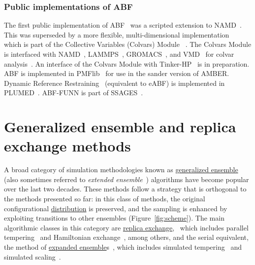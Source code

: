\documentclass[9pt,review]{livecoms}
\begin{document}
\subsubsection{Public implementations of ABF}

The first public implementation of ABF~\cite{Henin2004} was a scripted extension to NAMD~\cite{Phillips2020}.
This was superseded by a more flexible, multi-dimensional implementation~\cite{Henin2010a} which is part of the Collective Variables (Colvars) Module ~\cite{Fiorin2013}.
The Colvars Module is interfaced with NAMD~\cite{Phillips2020}, LAMMPS~\cite{Plimpton1995}, GROMACS~\cite{Abraham2015}, and VMD~\cite{Humphrey1996} for colvar analysis~\cite{Henin2022dashboard}.
An interface of the Colvars Module with Tinker-HP~\cite{Lagardere2018} is in preparation.
ABF is implemented in PMFlib~\cite{kulhanek2011pmflib} for use in the sander version of AMBER.
Dynamic Reference Restraining~\cite{Zheng2012} (equivalent to eABF) is implemented in PLUMED~\cite{Tribello2014}.
ABF-FUNN is part of SSAGES~\cite{Sidky2018}.



\section{Generalized ensemble and replica exchange methods}
\label{sec:generalized-ensemble}

A broad category of simulation methodologies known as \hyperlink{ref:GenEns} {generalized ensemble}~\cite{okamoto:biopolymers:2001:generalized-ensemble} (also sometimes referred to \emph{extended ensemble}~\cite{iba:intl-j-mod-phys-c:2001:extended-ensemble}) algorithms have become popular over the last two decades. These methods follow a strategy that is orthogonal to the methods presented so far: in this class of methods, the original configurational \hyperlink{ref:Distribution} {distribution}  is preserved, and the sampling is enhanced by exploiting transitions to other ensembles (Figure~\ref{fig:scheme}).
The main  algorithmic classes in this category are \hyperlink{ref:ReplEx} {replica exchange},~\cite{geyer:conference-proceedings:1991:replica-exchange} which includes parallel tempering~\cite{hukushima-nemoto:j-phys-soc-jpn:1996:parallel-tempering,hansmann:chem-phys-lett:1997:parallel-tempering-monte-carlo,sugita-okamoto:chem-phys-lett:1999:parallel-tempering-md} and Hamiltonian exchange~\cite{sugita-kitao-okamoto:jcp:2000:hamiltonian-exchange,fukunishi-watanabe-takada:jcp:2002:hamiltonian-exchange,jang-shin-pak:prl:2003:hamiltonian-exchange,kwak-hansmann:prl:2005:hamiltonian-exchange}, among others, and the serial equivalent, the method of \hyperlink{ref:ExpEns} {expanded ensemble}s~\cite{lyubartsev:jcp:1992:expanded-ensembles}, which includes simulated tempering~\cite{marinari-parisi:europhys-lett:1992:simulated-tempering,geyer-thompson:j-am-stat-assoc:1995:expanded-ensembles} and simulated scaling~\cite{li-fajer-yang:jcp:2007:simulated-scaling}.
\end{document}
